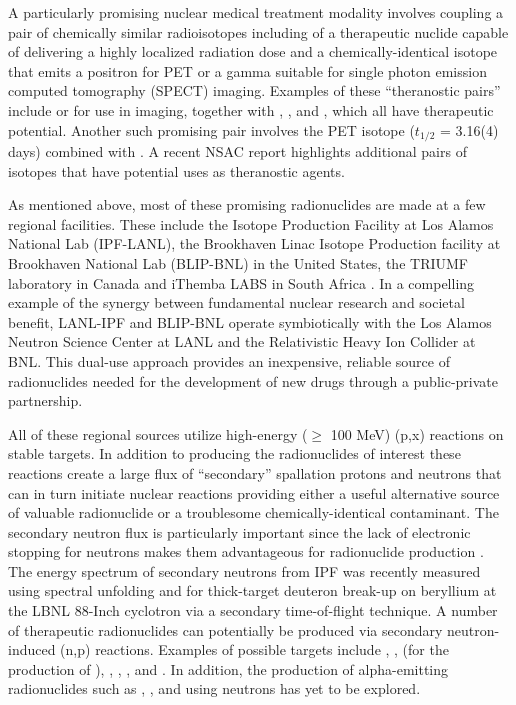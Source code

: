 \documentclass[letterpaper]{ar-1col}
\begin{document}
A particularly promising  nuclear medical treatment modality involves coupling a pair of chemically similar radioisotopes including of a therapeutic nuclide capable of delivering a highly localized radiation dose and a chemically-identical isotope that emits a positron for PET or a gamma suitable for single photon emission computed tomography (SPECT) imaging.
Examples of these \enquote{theranostic pairs} include  or  for use in imaging, together with , , and , which all have  therapeutic potential.
Another such promising  pair involves the PET isotope  ($t_{1/2}$ = 3.16(4) days) combined with .
 A recent NSAC report \cite{NSACIsotopesSubcommittee2015} highlights additional pairs of isotopes that have potential uses as theranostic agents.


As mentioned above, most of these promising radionuclides are made at a few regional facilities.
 These include the Isotope Production Facility at Los Alamos National Lab (IPF-LANL), the Brookhaven Linac Isotope Production facility at Brookhaven National Lab (BLIP-BNL) in the United States, the TRIUMF laboratory in Canada and iThemba LABS in South Africa \cite{Iae675,NSACIsotopesSubcommittee2015}.
 In a compelling example of the synergy between fundamental nuclear research and societal benefit, LANL-IPF and BLIP-BNL operate symbiotically with the Los Alamos Neutron Science Center at LANL and the Relativistic Heavy Ion Collider at BNL.
 This dual-use approach provides an inexpensive, reliable source of radionuclides needed for the development of new drugs through a public-private partnership.


All of these regional sources utilize high-energy ($\geq$ 100 MeV) (p,x) reactions on stable targets.
 In addition to producing the radionuclides of interest these reactions create a large flux of \enquote{secondary} spallation protons and neutrons that can in turn initiate nuclear reactions providing either a useful alternative source of valuable radionuclide or a troublesome chemically-identical contaminant.
 The secondary neutron flux is particularly important since the lack of electronic stopping for neutrons makes them advantageous for radionuclide production \cite{Voyles2017}.
 The energy spectrum of secondary neutrons from IPF was recently measured using spectral unfolding \cite{Mos16} and for thick-target deuteron break-up on beryllium at the LBNL 88-Inch cyclotron \cite{Harrig2018} via a secondary time-of-flight technique.
A number of therapeutic radionuclides can potentially be produced via secondary neutron-induced (n,p) reactions.
Examples of possible targets include , ,  (for the production of ), , , , and .
 In addition, the production of alpha-emitting radionuclides such as , , and  using neutrons has yet to be explored.
\end{document}
